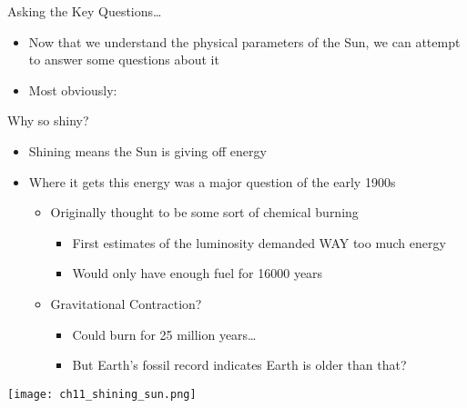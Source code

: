 \documentclass[pdf, aspectratio=169]{beamer}
\begin{document}
\begin{frame}{Asking the Key Questions\ldots}
  \begin{itemize}
	\item Now that we understand the physical parameters of the Sun, we can attempt to answer some questions about it
	\item Most obviously:
  \end{itemize}
  \begin{center}
  \end{center}
\end{frame}

\begin{frame}{Why so shiny?}
  \begin{itemize}
	\item Shining means the Sun is giving off energy
	\item Where it gets this energy was a major question of the early 1900s
	  \begin{itemize}
		\item Originally thought to be some sort of chemical burning
		  \begin{itemize}
			\item First estimates of the luminosity demanded WAY too much energy
			\item Would only have enough fuel for 16000 years
		  \end{itemize}
		\item Gravitational Contraction?
		  \begin{itemize}
			\item Could burn for 25 million years\ldots
			\item But Earth's fossil record indicates Earth is older than that?
		  \end{itemize}
	  \end{itemize}
  \end{itemize}
  \begin{center}
	\texttt{[image: ch11\_shining\_sun.png]}
  \end{center}
\end{frame}
\end{document}
